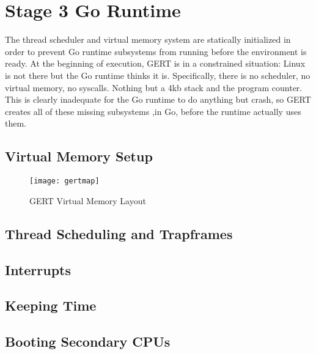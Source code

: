 \section{Stage 3 Go Runtime}
The thread scheduler and virtual memory system are statically initialized
in order to prevent Go runtime subsystems from running before the environment
is ready. At the beginning of execution, GERT is in a constrained
situation: Linux is not there but the Go runtime thinks it is. Specifically, there
is no scheduler, no virtual memory, no syscalls. Nothing but a 4kb stack
and the program counter. This is clearly inadequate for the Go runtime
to do anything but crash, so GERT creates all of these missing subsystems
,in Go, before the runtime actually uses them.


\subsection{Virtual Memory Setup}
\begin{figure}[h]
\begin{center}
  \texttt{[image: gertmap]}
\end{center}
  \caption{GERT Virtual Memory Layout} \label{fig:gertmap}
\end{figure}

\subsection{Thread Scheduling and Trapframes}
\subsection{Interrupts}
\subsection{Keeping Time}
\subsection{Booting Secondary CPUs}

